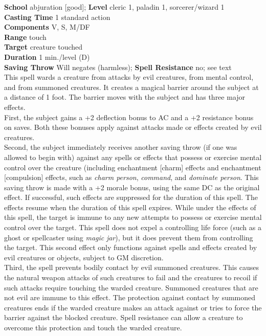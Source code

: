 \textbf{School} abjuration [good]; \textbf{Level} cleric 1, paladin 1, sorcerer/wizard 1\\
\textbf{Casting Time} 1 standard action\\
\textbf{Components} V, S, M/DF\\
\textbf{Range} touch\\
\textbf{Target} creature touched\\
\textbf{Duration} 1 min./level (D)\\
\textbf{Saving Throw }Will negates (harmless); \textbf{Spell Resistance} no; see text\\
This spell wards a creature from attacks by evil creatures, from mental control, and from summoned creatures. It creates a magical barrier around the subject at a distance of 1 foot. The barrier moves with the subject and has three major effects.\\
First, the subject gains a +2 deflection bonus to AC and a +2 resistance bonus on saves. Both these bonuses apply against attacks made or effects created by evil creatures.\\
Second, the subject immediately receives another saving throw (if one was allowed to begin with) against any spells or effects that possess or exercise mental control over the creature (including enchantment [charm] effects and enchantment [compulsion] effects, such as \textit{charm person}, \textit{command}, and \textit{dominate person}. This saving throw is made with a +2 morale bonus, using the same DC as the original effect. If successful, such effects are suppressed for the duration of this spell. The effects resume when the duration of this spell expires. While under the effects of this spell, the target is immune to any new attempts to possess or exercise mental control over the target. This spell does not expel a controlling life force (such as a ghost or spellcaster using \textit{magic} \textit{jar}), but it does prevent them from controlling the target. This second effect only functions against spells and effects created by evil creatures or objects, subject to GM discretion.\\
Third, the spell prevents bodily contact by evil summoned creatures. This causes the natural weapon attacks of such creatures to fail and the creatures to recoil if such attacks require touching the warded creature. Summoned creatures that are not evil are immune to this effect. The protection against contact by summoned creatures ends if the warded creature makes an attack against or tries to force the barrier against the blocked creature. Spell resistance can allow a creature to overcome this protection and touch the warded creature.\\
